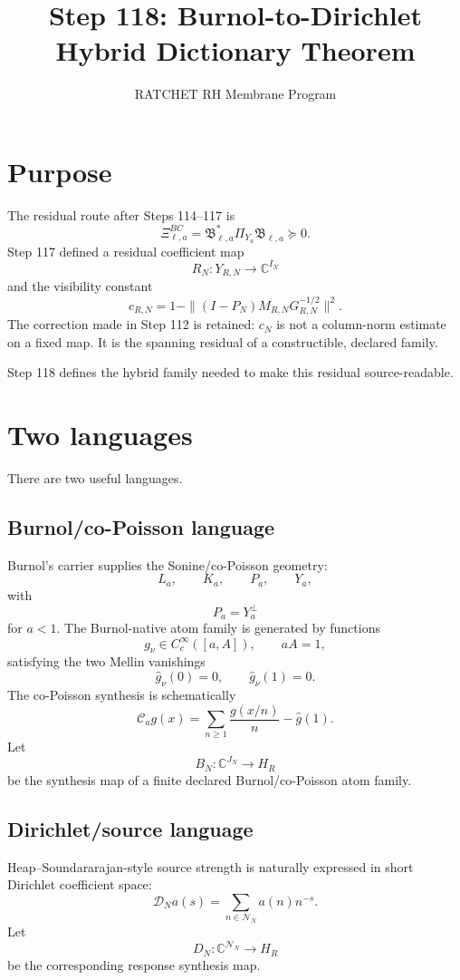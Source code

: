 \documentclass[11pt]{article}
\title{Step 118: Burnol-to-Dirichlet Hybrid Dictionary Theorem}
\author{RATCHET RH Membrane Program}
\date{}
\begin{document}
\maketitle

\section{Purpose}

The residual route after Steps 114--117 is
\[
\Xi^{BC}_{\ell,a}
=
\mathfrak B_{\ell,a}^*\Pi_{Y_a}\mathfrak B_{\ell,a}
\succeq 0.
\]
Step 117 defined a residual coefficient map
\[
R_N:Y_{R,N}\to\mathbb C^{I_N}
\]
and the visibility constant
\[
c_{R,N}
=
1-\|(I-P_N)M_{R,N}G_{R,N}^{-1/2}\|^2.
\]
The correction made in Step 112 is retained: \(c_N\) is not a column-norm estimate on a fixed map.
It is the spanning residual of a constructible, declared family.

Step 118 defines the hybrid family needed to make this residual source-readable.

\section{Two languages}

There are two useful languages.

\subsection{Burnol/co-Poisson language}

Burnol's carrier supplies the Sonine/co-Poisson geometry:
\[
L_a,\qquad K_a,\qquad P_a,\qquad Y_a,
\]
with
\[
P_a=Y_a^\perp
\]
for \(a<1\).  The Burnol-native atom family is generated by functions
\[
g_\nu\in C_c^\infty([a,A]),\qquad aA=1,
\]
satisfying the two Mellin vanishings
\[
\widehat g_\nu(0)=0,\qquad \widehat g_\nu(1)=0.
\]
The co-Poisson synthesis is schematically
\[
\mathcal C_a g(x)
=
\sum_{n\ge1}\frac{g(x/n)}{n}-\widehat g(1).
\]
Let
\[
B_N:\mathbb C^{J_N}\to H_R
\]
be the synthesis map of a finite declared Burnol/co-Poisson atom family.

\subsection{Dirichlet/source language}

Heap--Soundararajan-style source strength is naturally expressed in short Dirichlet coefficient
space:
\[
\mathcal D_N a(s)=\sum_{n\in\mathcal N_N}a(n)n^{-s}.
\]
Let
\[
D_N:\mathbb C^{\mathcal N_N}\to H_R
\]
be the corresponding response synthesis map.
\end{document}
